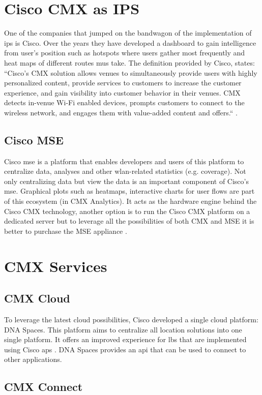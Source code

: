 \section{Cisco CMX as IPS}
One of the companies that jumped on the bandwagon of the implementation of \acrlong{ips} is Cisco. Over the years they have developed a dashboard to gain intelligence from user's position such as hotspots where users gather most frequently and heat maps of different routes \acrlong{mu}s take. The definition provided by Cisco, states: ``Cisco’s CMX solution allows venues to simultaneously provide users with highly personalized content, provide services to customers to increase the customer experience, and gain visibility into customer behavior in their venues. CMX detects in-venue Wi-Fi enabled devices, prompts customers to connect to the wireless network, and engages them with value-added content and offers.`` \cite[p.~24]{Hallock2015}.
\subsection{Cisco MSE}
Cisco \acrfull{mse} is a platform that enables developers and users of this platform to centralize data, analyses and other \acrshort{wlan}-related statistics (e.g. coverage). Not only centralizing data but view the data is an important component of Cisco's \acrshort{mse}. Graphical plots such as heatmaps, interactive charts for user flows are part of this ecosystem (in CMX Analytics). It acts as the hardware engine behind the Cisco CMX technology, another option is to run the Cisco CMX platform on a dedicated server but to leverage all the possibilities of both CMX and MSE it is better to purchase the MSE appliance \cite{Shah}.
\section{CMX Services}
\subsection{CMX Cloud}
To leverage the latest cloud possibilities, Cisco developed a single cloud platform: DNA Spaces. This platform aims to centralize all location solutions into one single platform. It offers an improved experience for \acrlong{lbs} that are implemented using Cisco \acrshort{ap}s \cite{Ciscok} \cite{Cisco2019a}. DNA Spaces provides an \acrfull{api} that can be used to connect to other applications.
\subsection{CMX Connect}
